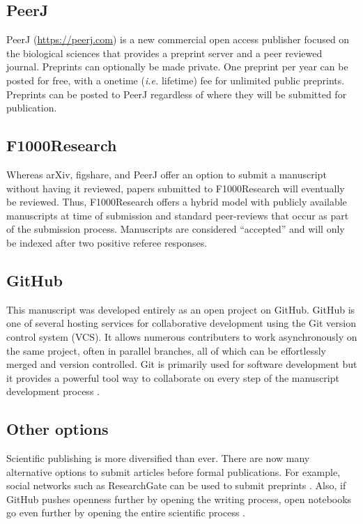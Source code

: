 \documentclass[letterpaper]{article}
\begin{document}
\subsection{PeerJ}

PeerJ (\href{https://peerj.com}{https://peerj.com}) is a new commercial open
access publisher focused on the biological sciences that provides a preprint
server and a peer reviewed journal. Preprints can optionally be made private.
One preprint per year can be posted for free, with a onetime (\emph{i.e.}
lifetime) fee for unlimited public preprints. Preprints can be posted to PeerJ
regardless of where they will be submitted for publication.

\subsection{F1000Research}\label{f1000r}

Whereas arXiv, figshare, and PeerJ offer an option to submit a manuscript
without having it reviewed, papers submitted to F1000Research will eventually be
reviewed. Thus, F1000Research offers a hybrid model with publicly available
manuscripts at time of submission and standard peer-reviews that occur as part
of the submission process. Manuscripts are considered ``accepted'' and will only
be indexed after two positive referee responses.

\subsection{GitHub}

This manuscript was developed entirely as an open project on GitHub. GitHub is
one of several hosting services for collaborative development using the Git
version control system (VCS). It allows numerous contributers to work
asynchronously on the same project, often in parallel branches, all of which can
be effortlessly merged and version controlled.  Git is primarily used for
software development \cite{aru12} but it provides a powerful tool way to
collaborate on every step of the manuscript development process \cite{ram13}.

\subsection{Other options}

Scientific publishing is more diversified than ever. There are now many 
alternative options to submit articles before formal publications. For 
example, social networks such as ResearchGate can be used to submit 
preprints \cite{lin12}. Also, if GitHub pushes openness further by opening 
the writing process, open notebooks go even further by opening the entire 
scientific process \cite{san11}. 
\end{document}
